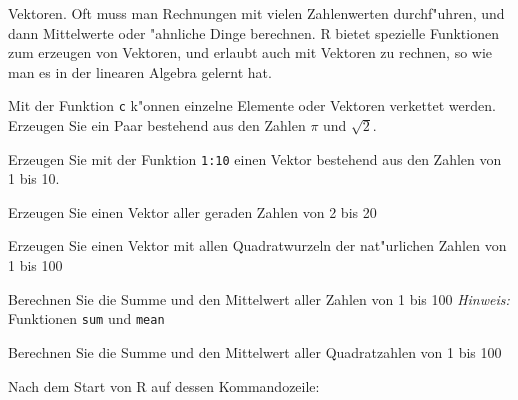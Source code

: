 Vektoren. Oft muss man Rechnungen mit vielen Zahlenwerten durchf"uhren,
und dann Mittelwerte oder "ahnliche Dinge berechnen. R bietet spezielle
Funktionen zum erzeugen von Vektoren, und erlaubt auch mit Vektoren
zu rechnen, so wie man es in der linearen Algebra gelernt hat.
\begin{teilaufgaben}
\item Mit der Funktion {\tt c} k"onnen einzelne Elemente oder
Vektoren verkettet werden. Erzeugen Sie ein Paar bestehend aus
den Zahlen $\pi$ und $\sqrt{2}$.
\item Erzeugen Sie mit der Funktion {\tt 1:10} einen Vektor bestehend
aus den Zahlen von 1 bis 10.
\item Erzeugen Sie einen Vektor aller geraden Zahlen von 2 bis 20
\item Erzeugen Sie einen Vektor mit allen Quadratwurzeln der nat"urlichen
Zahlen von 1 bis 100
\item Berechnen Sie die Summe und den Mittelwert aller Zahlen von 1 bis 100
\quad
{\it Hinweis\/:} Funktionen {\tt sum} und {\tt mean}
\item Berechnen Sie die Summe und den Mittelwert aller Quadratzahlen von 1 bis 100
\end{teilaufgaben}

\begin{loesung}
Nach dem Start von R auf dessen Kommandozeile:
\end{loesung}

